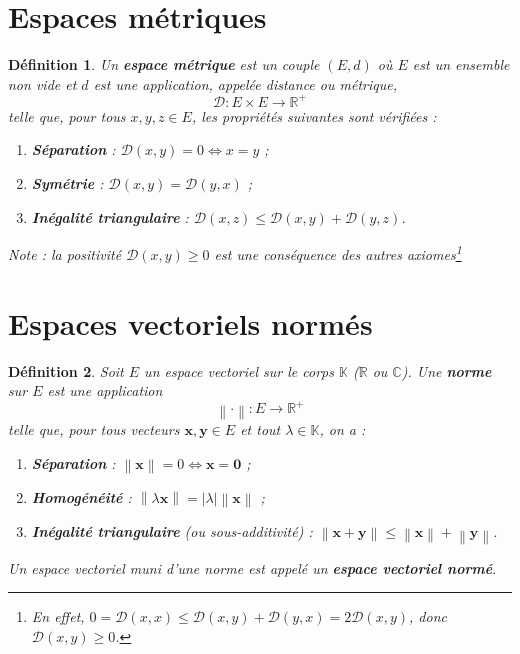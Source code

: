 \documentclass{article}
\newtheorem{definition}{Définition}[section]
\newcommand{\norm}[1]{\left\lVert#1\right\rVert}
\begin{document}
\section{Espaces métriques}

\begin{definition}
Un \textbf{espace métrique} est un couple $(E, d)$ où $E$ est un ensemble non vide et $d$ est une application, appelée \emph{distance} ou \emph{métrique},
\[
\mathcal{D} : E \times E \to \mathbb{R}^+
\]
telle que, pour tous $x, y, z \in E$, les propriétés suivantes sont vérifiées :
\begin{enumerate}
    \item \textbf{Séparation} : $\mathcal{D}(x, y) = 0 \iff x = y$ ;
    \item \textbf{Symétrie} : $\mathcal{D}(x, y) = \mathcal{D}(y, x)$ ;
    \item \textbf{Inégalité triangulaire} : $\mathcal{D}(x, z) \leq \mathcal{D}(x, y) + \mathcal{D}(y, z)$.
\end{enumerate}
\textit{Note : la positivité $\mathcal{D}(x,y) \ge 0$ est une conséquence des autres axiomes\footnote{En effet, $0 = \mathcal{D}(x,x) \le \mathcal{D}(x,y) + \mathcal{D}(y,x) = 2\mathcal{D}(x,y)$, donc $\mathcal{D}(x,y) \ge 0$.}}
\end{definition}

\section{Espaces vectoriels normés}

\begin{definition}
Soit $E$ un espace vectoriel sur le corps $\mathbb{K}$ ($\mathbb{R}$ ou $\mathbb{C}$). Une \textbf{norme} sur $E$ est une application
\[
\norm{\cdot} : E \to \mathbb{R}^+
\]
telle que, pour tous vecteurs $\mathbf{x}, \mathbf{y} \in E$ et tout $\lambda \in \mathbb{K}$, on a :
\begin{enumerate}
    \item \textbf{Séparation} : $\norm{\mathbf{x}} = 0 \iff \mathbf{x} = \mathbf{0}$ ;
    \item \textbf{Homogénéité} : $\norm{\lambda \mathbf{x}} = |\lambda| \norm{\mathbf{x}}$ ;
    \item \textbf{Inégalité triangulaire} (ou sous-additivité) : $\norm{\mathbf{x} + \mathbf{y}} \leq \norm{\mathbf{x}} + \norm{\mathbf{y}}$.
\end{enumerate}
Un espace vectoriel muni d'une norme est appelé un \textbf{espace vectoriel normé}.
\end{definition}
\end{document}
